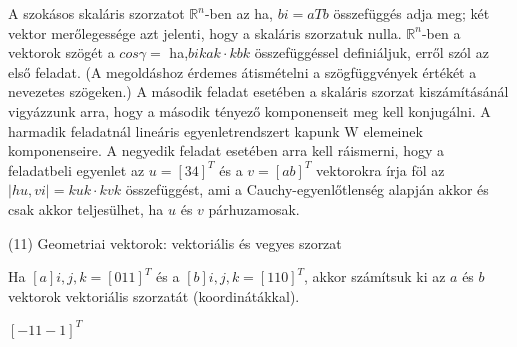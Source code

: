 \begin{frame}
  \begin{tcolorbox}[title={10/4. {\symqueen}}]
    A szokásos skaláris szorzatot $\mathbb{R}^n$-ben az ha, $bi = aTb$ összefüggés adja meg; két vektor merőlegessége azt jelenti, hogy a skaláris szorzatuk nulla. $\mathbb{R}^n$-ben a vektorok szögét a $cos{\gamma} =$ ha,$bi kak \cdot kbk$ összefüggéssel definiáljuk, erről szól az első feladat. (A megoldáshoz érdemes átismételni a szögfüggvények értékét a nevezetes szögeken.) A második feladat esetében a skaláris szorzat kiszámításánál vigyázzunk arra, hogy a második tényező komponenseit meg kell konjugálni. A harmadik feladatnál lineáris egyenletrendszert kapunk W elemeinek komponenseire. A negyedik feladat esetében arra kell ráismerni, hogy a feladatbeli egyenlet az $u = [3 4]^T$ és a $v = [a b]^T$ vektorokra írja föl az $|hu,vi| = kuk \cdot kvk$ összefüggést, ami a Cauchy-egyenlőtlenség alapján akkor és csak akkor teljesülhet, ha $u$ és $v$ párhuzamosak.
  \end{tcolorbox}
\end{frame}


\begin{frame}[plain]
\begin{tcolorbox}[center, colback={myyellow}, coltext={black}, colframe={myyellow}]
    {\RHuge  (11) Geometriai vektorok: vektoriális és vegyes szorzat }
    \mmedskip
\end{tcolorbox}
\end{frame}

\begin{frame}
  \begin{tcolorbox}[title={11/1. {\symknight}}]
    Ha $[a]i,j,k = [0 1 1]^T$ és a $[b]i,j,k = [1 1 0]^T$, akkor számítsuk ki az $a$ és $b$ vektorok vektoriális szorzatát (koordinátákkal).

  \tcblower

    \mmedskip 
    
    $[-1 1 -1]^T$
  \end{tcolorbox}
\end{frame}


